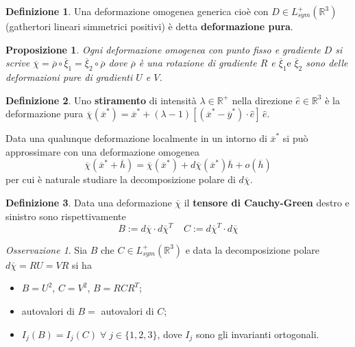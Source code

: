 \documentclass{book}
\theoremstyle{plain}
\theoremstyle{plain}
\theoremstyle{plain}
\theoremstyle{plain}
\theoremstyle{plain}
\newtheorem{prop}{Proposizione}[chapter]
\theoremstyle{definition}
\newtheorem{defi}{Definizione}[chapter]
\theoremstyle{remark}
\newtheorem*{oss}{Osservazione}
\theoremstyle{definition}
\begin{document}
\begin{defi}
    Una deformazione omogenea generica cioè con $D\in L_{sym}^+(\mathbb{R}^3)$ (gathertori lineari simmetrici positivi) è detta \textbf{deformazione pura}. 
\end{defi}

\begin{prop}
    Ogni deformazione omogenea con punto fisso e gradiente $D$ si scrive $\overline{\chi}=\overline{\rho}\circ\overline{\xi}_1=\overline{\xi}_2\circ\overline{\rho}$ dove $\overline{\rho}$ è una rotazione di gradiente $R$ e $\overline{\xi}_1 \text{e }\overline{\xi}_2$ sono delle deformazioni pure di gradienti $U$ e $V$.
\end{prop}

\begin{defi}
    Uno \textbf{stiramento} di intensità $\lambda\in\mathbb{R}^+$ nella direzione $\hat{e}\in\mathbb{R}^3$ è la deformazione pura  $\overline{\chi}(\overline{x}^*)=\overline{x}^*+(\lambda-1)[(\overline{x}^*-\overline{y}^*)\cdot\hat{e}]\,\hat{e}$.
\end{defi}

\noindent Data una qualunque deformazione localmente in un intorno di $\overline{x}^*$ si può approssimare con una deformazione omogenea
\begin{displaymath}
    \overline{\chi}(\overline{x}^*+\overline{h})=\overline{\chi}(\overline{x}^*)+d\overline{\chi}(\overline{x}^*)\overline{h} +o(\overline{h})
\end{displaymath}
per cui è naturale studiare la decomposizione polare di $d\overline{\chi}$.

\begin{defi}
    Data una deformazione $\overline{\chi}$ il \textbf{tensore di Cauchy-Green} destro e sinistro sono rispettivamente
    \begin{displaymath}
        \boxed{B:=d\overline{\chi}\cdot d\overline{\chi}^T} \ \ \ \ \ \boxed{C:=d\overline{\chi}^T\cdot d\overline{\chi}}
    \end{displaymath}
\end{defi}

\begin{oss}
    Sia $B$ che $C \in L_{sym}^+(\mathbb{R}^3)$ e data la decomposizione polare $d\overline{\chi}=RU=VR$ si ha
    \begin{itemize}
        \item $B=U^2$, $C=V^2$, $B=RCR^T$;
        \item autovalori di $B =$ autovalori di $C$;
        \item $I_j(B)=I_j(C)\;\forall \;j\in \{1,2,3\}$, dove $I_j$ sono gli invarianti ortogonali.
    \end{itemize}
\end{oss}
\end{document}
